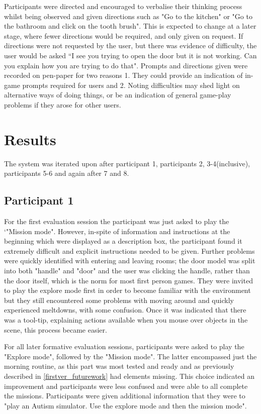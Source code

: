 \documentclass[11pt]{report}
\begin{document}
Participants were directed and encouraged to verbalise their thinking process whilst being observed and given directions such as "Go to the kitchen" or "Go to the bathroom and click on the tooth brush". This is expected to change at a later stage, where fewer directions would be required, and only given on request. If directions were not requested by the user, but there was evidence of difficulty, the user would be asked ``I see you trying to open the door but it is not working. Can you explain how you are trying to do that". Prompts and directions given were recorded on pen-paper for two reasons 1. They could provide an indication of in-game prompts required for users and 2. Noting difficulties may shed light on alternative ways of doing things, or be an indication of general game-play problems if they arose for other users. 

\section{Results}
The system was iterated upon after participant 1, participants 2, 3-4(inclusive), participants 5-6 and again after 7 and 8.

\subsection*{Participant 1}

For the first evaluation session the participant was just asked to play the `"Mission mode". However, in-spite of information and instructions at the beginning which were displayed as a description box, the participant found it extremely difficult and explicit instructions needed to be given. Further problems were quickly identified with entering and leaving rooms; the door model was split into both "handle" and "door" and the user was clicking the handle, rather than the door itself, which is the norm for most first person games. They were invited to play the explore mode first in order to become familiar with the environment but they still encountered some problems with moving around and quickly experienced meltdowns, with some confusion. Once it was indicated that there was a tool-tip, explaining actions available when you mouse over objects in the scene, this process became easier. 

For all later formative evaluation sessions, participants were asked to play the "Explore mode", followed by the "Mission mode". The latter encompassed just the morning routine, as this part was most tested and ready and as previously described in \ref{firstver_futurework} had elements missing. This choice indicated an improvement and participants were less confused and were able to all complete the missions. Participants were given additional information that they were to "play an Autism simulator. Use the explore mode and then the mission mode".
\end{document}
